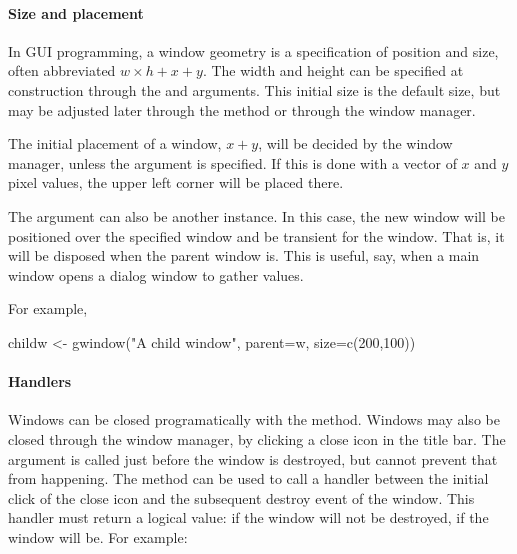 \paragraph{Size and placement}
In GUI programming, a window geometry is a specification of position
and size, often abbreviated $w \times h + x + y$. The width and height
can be specified at construction through the 
and  arguments. This initial size is the
default size, but may be adjusted later through the
 method or through the window manager. 

The initial placement of a window, $x+y$, will be decided by the window
manager, unless the  argument is
specified. If this is done with a vector of $x$ and $y$ pixel values,
the upper left corner will be placed there. 

The  argument can also be another 
instance. In this case, the new window will be positioned over the
specified window and be transient for the window. That is, it will be
disposed when the parent window is. This is useful, say, when a main
window opens a dialog window to gather values.

For example,
\begin{Schunk}
\begin{Sinput}
 childw <- gwindow("A child window", parent=w, size=c(200,100))
\end{Sinput}
\end{Schunk}


\paragraph{Handlers}
Windows can be closed programatically with the
 method. Windows may also be closed through
the window manager, by clicking a close icon in the title bar.  The
 argument is called just before the window
is destroyed, but cannot prevent that from happening.  The
 method can be used to call a
handler between the initial click of the close icon and the subsequent
destroy event of the window. This handler must return a logical value:
if  the window will not be destroyed, if  the
window will be. For example:

\begin{Schunk}
\end{Schunk}


